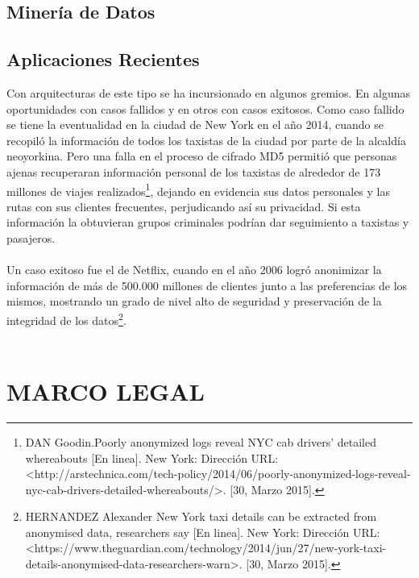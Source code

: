 \documentclass[a4paper,openright,12pt]{book}
\theoremstyle{definition}
\theoremstyle{remark}
\begin{document}
\subsection{Minería de Datos}
\subsection{Aplicaciones Recientes}
Con arquitecturas de  este  tipo se ha incursionado  en  algunos gremios. En algunas oportunidades con casos fallidos  y en otros con casos exitosos. Como caso fallido se tiene  la eventualidad en la  ciudad de New York en el año 2014, cuando se recopiló la información de todos los taxistas de la ciudad por parte de la alcaldía neoyorkina. Pero una falla en el proceso de cifrado MD5 permitió que personas ajenas recuperaran información personal de los taxistas de alrededor de 173 millones de viajes realizados\footnote{DAN Goodin.Poorly anonymized logs reveal NYC cab drivers’ detailed whereabouts [En linea]. New York: Dirección URL: <http://arstechnica.com/tech-policy/2014/06/poorly-anonymized-logs-reveal-nyc-cab-drivers-detailed-whereabouts/>. [30, Marzo 2015].}, dejando en evidencia sus datos personales y las rutas con sus clientes frecuentes,  perjudicando así su privacidad. Si esta información la obtuvieran grupos criminales podrían dar seguimiento a taxistas y pasajeros.\\\\
Un caso exitoso fue el de Netflix, cuando en el año 2006 logró anonimizar la información de más de 500.000 millones de clientes junto a las preferencias de los mismos, mostrando un grado de nivel alto de seguridad y preservación de la integridad de los datos\footnote{HERNANDEZ Alexander New York taxi details can be extracted from anonymised data, researchers say [En linea]. New York: Dirección URL: <https://www.theguardian.com/technology/2014/jun/27/new-york-taxi-details-anonymised-data-researchers-warn>. [30, Marzo 2015].}.\\\\

\section{MARCO LEGAL}
\end{document}
